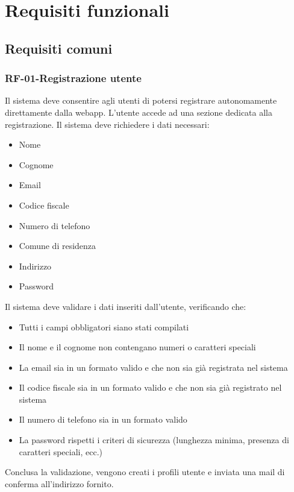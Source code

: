 \setcounter{section}{1}
\setlength{\parindent}{0pt}  %
\setlength{\parskip}{6pt}
\section{Requisiti funzionali}
\subsection{Requisiti comuni}
\subsubsection*{RF-01-Registrazione utente}
Il sistema deve consentire agli utenti di potersi registrare autonomamente direttamente dalla webapp. L'utente accede ad una sezione dedicata alla registrazione. Il sistema deve richiedere i dati necessari:
\begin{itemize}
    \item Nome
    \item Cognome
    \item Email
    \item Codice fiscale
    \item Numero di telefono
    \item Comune di residenza
    \item Indirizzo
    \item Password
\end{itemize}
Il sistema deve validare i dati inseriti dall'utente, verificando che:
\begin{itemize}
    \item Tutti i campi obbligatori siano stati compilati
    \item Il nome e il cognome non contengano numeri o caratteri speciali
    \item La email sia in un formato valido e che non sia già registrata nel sistema
    \item Il codice fiscale sia in un formato valido e che non sia già registrato nel sistema
    \item Il numero di telefono sia in un formato valido
    \item La password rispetti i criteri di sicurezza (lunghezza minima, presenza di caratteri speciali, ecc.)
\end{itemize}
Conclusa la validazione, vengono creati i profili utente e inviata una mail di conferma all'indirizzo fornito.

